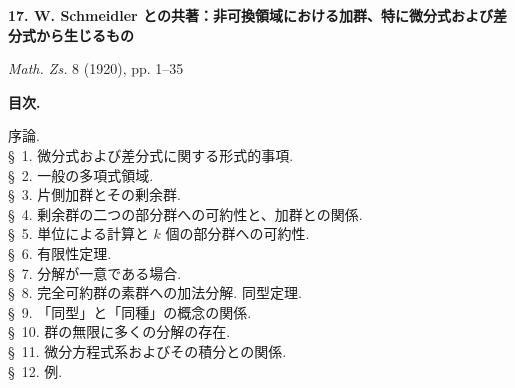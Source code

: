 \documentclass[11pt]{article}
\newcommand{\modu}[1]{\;\operatorname{mod} #1}
\providecommand{\dd}{\mathrm d}
\providecommand{\p}{\partial}
\begin{document}
\providecommand{\p}{\partial}
\providecommand{\dd}{\mathrm d}
\providecommand{\modu}[1]{\;\operatorname{mod} #1}
\providecommand{\mM}{\mathfrak{M}}
\providecommand{\mN}{\mathfrak{N}}
\providecommand{\mL}{\mathfrak{L}}
\providecommand{\mG}{\mathfrak{G}}
\providecommand{\mA}{\mathfrak{A}}
\providecommand{\mB}{\mathfrak{B}}
\providecommand{\mX}{\mathfrak{X}}
\providecommand{\mY}{\mathfrak{Y}}
\providecommand{\mU}{\mathfrak{U}}
\providecommand{\mP}{\mathfrak{P}}
\providecommand{\mQ}{\mathfrak{Q}}
\providecommand{\mS}{\mathfrak{S}}
\providecommand{\mD}{\mathfrak{D}}
\providecommand{\mR}{\mathfrak{R}}
\providecommand{\mV}{\mathfrak{V}}
\providecommand{\ma}{\mathfrak{a}}
\providecommand{\mb}{\mathfrak{b}}
\providecommand{\mx}{\mathfrak{x}}
\providecommand{\my}{\mathfrak{y}}
\providecommand{\mz}{\mathfrak{z}}
\providecommand{\me}{\mathfrak{e}}
\providecommand{\mbarA}{\overline{\mathfrak{A}}}
\providecommand{\mbarB}{\overline{\mathfrak{B}}}
\providecommand{\bara}{\overline{\mathfrak{a}}}

\clearpage
\setcounter{footnote}{0}
\begin{center}
{\Large\bfseries 17. W. Schmeidler との共著：非可換領域における加群、特に微分式および差分式から生じるもの}\par
\vspace{1em}
\emph{Math. Zs.} 8 (1920), pp. 1--35
\end{center}

\begin{center}
\textbf{目次.}
\end{center}
\begin{center}
\begin{minipage}{0.88\linewidth}
序論.\\
\S~1. 微分式および差分式に関する形式的事項.\\
\S~2. 一般の多項式領域.\\
\S~3. 片側加群とその剰余群.\\
\S~4. 剰余群の二つの部分群への可約性と、加群との関係.\\
\S~5. 単位による計算と $k$ 個の部分群への可約性.\\
\S~6. 有限性定理.\\
\S~7. 分解が一意である場合.\\
\S~8. 完全可約群の素群への加法分解. 同型定理.\\
\S~9. 「同型」と「同種」の概念の関係.\\
\S~10. 群の無限に多くの分解の存在.\\
\S~11. 微分方程式系およびその積分との関係.\\
\S~12. 例.
\end{minipage}
\end{center}
\end{document}
